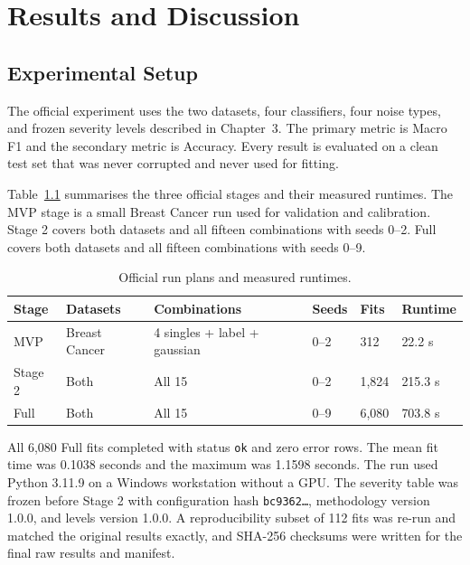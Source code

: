 \chapter{Results and Discussion}

\section{Experimental Setup}

The official experiment uses the two datasets, four classifiers, four noise types, and frozen severity levels described in Chapter~3. The primary metric is Macro F1 and the secondary metric is Accuracy. Every result is evaluated on a clean test set that was never corrupted and never used for fitting.

Table~\ref{tab:runplans} summarises the three official stages and their measured runtimes. The MVP stage is a small Breast Cancer run used for validation and calibration. Stage 2 covers both datasets and all fifteen combinations with seeds 0--2. Full covers both datasets and all fifteen combinations with seeds 0--9.

\begin{table}[H]
\centering
\caption{Official run plans and measured runtimes.}
\label{tab:runplans}
\footnotesize
\begin{tabular}{p{1.1cm}p{1.9cm}p{2.4cm}p{1.1cm}p{1.4cm}p{1.9cm}}
\toprule
\textbf{Stage} & \textbf{Datasets} & \textbf{Combinations} & \textbf{Seeds} & \textbf{Fits} & \textbf{Runtime} \\
\midrule
MVP & Breast Cancer & 4 singles + label + gaussian & 0--2 & 312 & 22.2 s \\
Stage 2 & Both & All 15 & 0--2 & 1,824 & 215.3 s \\
Full & Both & All 15 & 0--9 & 6,080 & 703.8 s \\
\bottomrule
\end{tabular}
\end{table}

All 6,080 Full fits completed with status \texttt{ok} and zero error rows. The mean fit time was 0.1038 seconds and the maximum was 1.1598 seconds. The run used Python 3.11.9 on a Windows workstation without a GPU. The severity table was frozen before Stage 2 with configuration hash \texttt{bc9362\ldots}, methodology version 1.0.0, and levels version 1.0.0. A reproducibility subset of 112 fits was re-run and matched the original results exactly, and SHA-256 checksums were written for the final raw results and manifest.

